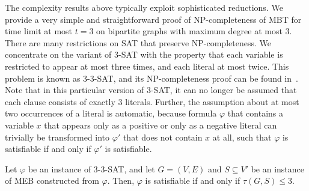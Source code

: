 The complexity results above typically exploit sophisticated reductions.
We provide a very simple and straightforward proof of NP-completeness of MBT for time limit at most $t=3$ on bipartite graphs with maximum degree at most 3.
There are many restrictions on SAT that preserve NP-completeness.
We concentrate on the variant of 3-SAT with the property that each variable is restricted to appear at most three times, and each literal at most twice. 
This problem is known as 3-3-SAT, and its NP-completeness proof can be found in~\cite{papadimitriou94}. 
Note that in this particular version of 3-SAT, it can no longer be assumed that each clause consists of exactly 3 literals.
Further, the assumption about at most two occurrences of a literal is automatic, 
because formula $\varphi$ that contains a variable $x$ that appears only as a positive or only as a negative literal can trivially be transformed into $\varphi'$ that does not contain $x$ at all, 
such that $\varphi$ is satisfiable if and only if $\varphi'$ is satisfiable.
\begin{lemma}\label{lemma:mbtred}
Let $\varphi$ be an instance of \textsc{3-3-SAT}, and let $G=(V,E)$ and $S\subseteq V'$ be an instance of MEB constructed from $\varphi$. 
Then, $\varphi$ is satisfiable if and only if $\tau(G,S)\leq 3$.
\end{lemma}
